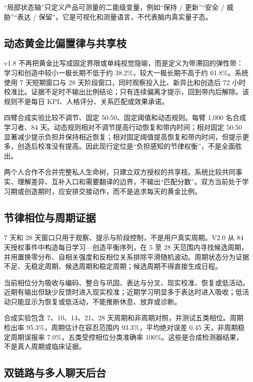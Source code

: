 \documentclass[UTF8,a4paper,11pt]{ctexart}
\begin{document}
“局部状态轴”只定义产品可测量的二能级变量，例如“保持 / 更新”“安全 / 威胁”“表达 / 保留”。它是可视化和测量语言，不代表脑内真实量子态。

\subsection{动态黄金比偏置律与共享枝}

v1.8 不再把黄金比写成固定界限或单纯视觉隐喻，而是定义为带滞回的弹性带：学习和创造中较小一极长期不低于约 38.2\%，较大一极长期不高于约 61.8\%。系统使用 7 天短期窗口与 28 天阶段窗口，同时观察投入比、新异比和创造后 72 小时校准比。证据不足时不输出比例结论；只有连续偏离才提示，回到带内后解除。该规则不是每日 KPI、人格评分、关系匹配或效果承诺。

四臂合成实验比较不调节、固定 50:50、固定阈值和动态规则。每臂 1,000 名合成学习者、84 天。动态规则相对不调节提高行动恢复和带内时间；相对固定 50:50 显著减少提示负担并保持相近恢复；相对固定阈值提高恢复和带内时间，但提示更多，创造后校准没有提高。因此现行定位是“负担感知的节律权衡”，不是全面胜出。

两个人合作不合并完整私人生命树，只建立双方授权的共享枝。系统比较共同事实、理解差异、互补入口和需要翻译的边界，不输出“匹配分数”。双方当前处于学习期或创造期时，应安排交接动作，而不是追求每天的黄金比例。

\subsection{节律相位与周期证据}

7 天和 28 天窗口只用于观察、提示与阶段控制，不是用户真实周期。V2.0 从 84 天授权事件中构造每日学习—创造平衡序列，在 5 至 28 天范围内寻找候选周期，并用置换零分布、自相关强度和反相位关系排除平滑随机波动。周期状态分为证据不足、无稳定周期、候选周期和稳定周期；候选周期不得直接生成日程。

当前相位分为吸收与编码、整合与巩固、表达与分叉、现实校准、恢复或低活动。近期有输出但缺少反馈时进入现实校准；近期学习明显多于表达时进入吸收；低活动只能显示为恢复或低活动，不能推断休息、放弃或诊断。

合成实验包含 7、10、14、21、28 天周期和非周期对照，并测试五类相位。周期检出率 95.3\%，周期估计在容忍范围内 93.3\%，平均绝对误差 0.45 天，非周期稳定周期误报率 7.0\%，五类受控相位分类准确率 100\%。这些是合成检测器结果，不是真人周期或临床证据。


\subsection{双链路与多人聊天后台}
\end{document}
